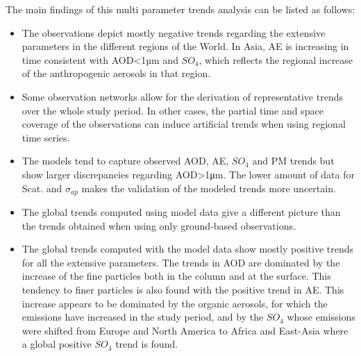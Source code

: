 \documentclass[journal abbreviation, manuscript]{copernicus}
\begin{document}
The main findings of this multi parameter trends analysis can be listed as follows:
\begin{itemize}
 \item The observations depict mostly negative trends regarding the extensive parameters in the different regions of the World. In Asia, AE is increasing in time consistent with AOD<1µm and $SO_{4}$, which reflects the regional increase of the anthropogenic aerosols in that region.
 \item Some observation networks allow for the derivation of representative trends over the whole study period. In other cases, the partial time and space coverage of the observations can induce artificial trends when using regional time series.
 \item The models tend to capture observed AOD, AE, $SO_{4}$ and PM trends but show larger discrepancies regarding AOD>1μm. The lower amount of data for Scat. and $\sigma_{ap}$ makes the validation of the modeled trends more uncertain.
 \item The global trends computed using model data give a different picture than the trends obtained when using only ground-based observations.
 \item The global trends computed with the model data show mostly positive trends for all the extensive parameters. The trends in AOD are dominated by the increase of the fine particles both in the column and at the surface. This tendency to finer particles is also found with the positive trend in AE. This increase appears to be dominated by the organic aerosols, for which the emissions have increased in the study period, and by the $SO_{4}$ whose emissions were shifted from Europe and North America to Africa and East-Asia where a global positive $SO_{4}$ trend is found.
\end{itemize}
\end{document}
